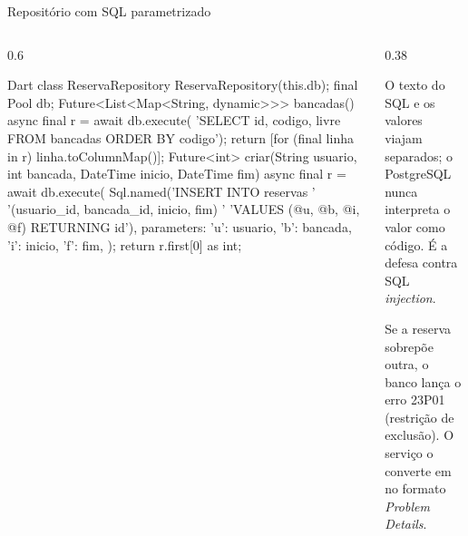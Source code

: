 \documentclass[aspectratio=169,10pt]{beamer}
\begin{document}
\begin{frame}[fragile]{Repositório com SQL parametrizado}
  \begin{columns}[T]
    \begin{column}{0.6\textwidth}
\begin{codigo}[title=lib/reserva\_repository.dart]{Dart}
class ReservaRepository {
  ReservaRepository(this.db);
  final Pool db;
  Future<List<Map<String, dynamic>>> bancadas() async {
    final r = await db.execute(
        'SELECT id, codigo, livre FROM bancadas ORDER BY codigo');
    return [for (final linha in r) linha.toColumnMap()];
  }
  Future<int> criar(String usuario, int bancada,
      DateTime inicio, DateTime fim) async {
    final r = await db.execute(
      Sql.named('INSERT INTO reservas '
          '(usuario_id, bancada_id, inicio, fim) '
          'VALUES (@u, @b, @i, @f) RETURNING id'),
      parameters: {'u': usuario, 'b': bancada,
                   'i': inicio, 'f': fim},
    );
    return r.first[0] as int;
  }
}
\end{codigo}
    \end{column}
    \begin{column}{0.38\textwidth}
      \begin{conceito}
        O texto do SQL e os valores viajam separados; o PostgreSQL nunca interpreta o valor como código. É a defesa contra SQL \emph{injection}.
      \end{conceito}
      \begin{pordentro}
        Se a reserva sobrepõe outra, o banco lança o erro 23P01 (restrição de exclusão). O serviço o converte em  no formato \emph{Problem Details}.
      \end{pordentro}
    \end{column}
  \end{columns}
\end{frame}
\end{document}
